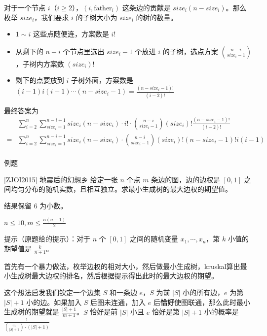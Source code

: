 \documentclass[UTF8]{beamer}
\begin{document}
    \begin{frame}
        对于一个节点 $i$（$i\ge 2$），$(i,\mathrm{father}_i)$ 这条边的贡献是 $size_i(n-size_i)$。那么枚举 $size_i$，我们要求 $i$ 的子树大小为 $size_i$ 的树的数量。
        \begin{itemize}
            \item $1\sim i$ 这些点随便连，方案数是 $i!$
            \item 从剩下的 $n-i$ 个节点里选出 $size_i-1$ 个放进 $i$ 的子树，选点方案 $\binom{n-i}{size_i-1}$，子树内方案数 $(size_i)!$
            \item 剩下的点要放到 $i$ 子树外面，方案数是 $(i-1)i(i+1)\cdots(n-size_i-1)=\frac{(n-size_i-1)!}{(i-2)!}$
        \end{itemize}
        最终答案为
        $$
        \begin{aligned}
        &\sum_{i=2}^n\sum_{size_i=1}^{n-i+1}size_i(n-size_i)\cdot i!\cdot\binom{n-i}{size_i-1}(size_i)!\frac{(n-size_i-1)!}{(i-2)!}\\
        =&\sum_{i=2}^n\sum_{size_i=1}^{n-i+1}size_i(n-size_i)\cdot\binom{n-i}{size_i-1}(size_i)!(n-size_i-1)!i(i-1)\\
        \end{aligned}
        $$
    \end{frame}

    \begin{frame}{例题}
        \begin{block}{[ZJOI2015] 地震后的幻想乡}
            给定一张 $n$ 个点 $m$ 条边的图，边的边权是 $[0,1]$ 之间均匀分布的随机实数，且相互独立。求最小生成树的最大边权的期望值。

            结果保留 $6$ 为小数。

            $n\le 10,m\le \frac{n(n-1)}{2}$

            提示（原题给的提示）：对于 $n$ 个 $[0,1]$ 之间的随机变量 $x_1,\cdots,x_n$，第 $k$ 小值的期望值是 $\frac{k}{n+1}$。
        \end{block}
        \pause

        首先有一个暴力做法，枚举边权的相对大小，然后做最小生成树，kruskal算出最小生成树最大边权的排名，然后根据提示得出此时的最大边权的期望。

        这个想法启发我们钦定一个边集 $S$ 和一条边 $e$，$S$ 为前 $|S|$ 小的所有边，$e$ 为第 $|S|+1$ 小的边。如果加入 $S$ 后图未连通，加入 $e$ 后\textbf{恰好}使图联通，那么此时最小生成树的期望就是 $\frac{|S|+1}{m+1}$。$S$ 恰好是前 $|S|$ 小且 $e$ 恰好是第 $|S|+1$ 小的概率是 $\frac{1}{\binom{m}{|S|+1}\cdot (|S|+1)}$
    \end{frame}
\end{document}
